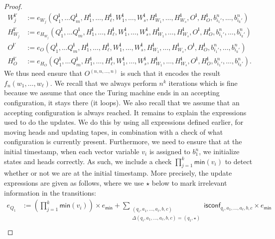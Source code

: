 \begin{proof}
\begin{align*}
		W_j^{\mathbf{i}'}&:=e_{W_j}(Q_1^{\mathbf{i}},\ldots Q_m^{\mathbf{i}},H_1^{\mathbf{i}},\ldots,H_\ell^{\mathbf{i}},W_1^{\mathbf{i}},\ldots,W_s^{\mathbf{i}},H_{W_1}^{\mathbf{i}},\ldots,H_{W_s}^{\mathbf{i}},O^{\mathbf{i}},H_O^{\mathbf{i}},b_{i_1'}^n,\ldots,b_{i_k'}^n)\\
				H_{W_j}^{\mathbf{i}'}&:=e_{H_{W_j}}(Q_1^{\mathbf{i}},\ldots Q_m^{\mathbf{i}},H_1^{\mathbf{i}},\ldots,H_\ell^{\mathbf{i}},W_1^{\mathbf{i}},\ldots,W_s^{\mathbf{i}},H_{W_1}^{\mathbf{i}},\ldots,H_{W_s}^{\mathbf{i}},O^{\mathbf{i}},H_O^{\mathbf{i}},b_{i_1'}^n,\ldots,b_{i_k'}^n)\\
O^{\mathbf{i}'}&:=e_{O}(Q_1^{\mathbf{i}},\ldots Q_m^{\mathbf{i}},H_1^{\mathbf{i}},\ldots,H_\ell^{\mathbf{i}},W_1^{\mathbf{i}},\ldots,W_s^{\mathbf{i}},H_{W_1}^{\mathbf{i}},\ldots,H_{W_s}^{\mathbf{i}},O^{\mathbf{i}},H_O^{\mathbf{i}},b_{i_1'}^n,\ldots,b_{i_k'}^n)\\
H_{O}^{\mathbf{i}'}&:=e_{H_O}(Q_1^{\mathbf{i}},\ldots Q_m^{\mathbf{i}},H_1^{\mathbf{i}},\ldots,H_\ell^{\mathbf{i}},W_1^{\mathbf{i}},\ldots,W_s^{\mathbf{i}},H_{W_1}^{\mathbf{i}},\ldots,H_{W_s}^{\mathbf{i}},O^{\mathbf{i}},H_O^{\mathbf{i}},b_{i_1'}^n,\ldots,b_{i_k'}^n).
	\end{align*}
We thus need ensure that  $O^{(n,n,\ldots,n)}$ is such that it encodes the result $f_n(w_1,\ldots,w_\ell)$. We recall that we
always perform $n^k$ iterations which is fine because we assume that once the Turing machine ends in an accepting configuration,
it stays there (it loops). We also recall that we assume that an accepting configuration is always reached. It remains to
explain the expressions used to do the updates. We do this by using all expressions defined earlier, for moving heads and updating
tapes, in combination with a check of what configuration is currently present. Furthermore, we need to ensure that at the initial timestamp,
when each vector variable $v_i$ is assigned to $b_1^n$, we initialize states and heads correctly. As such, we include a check
$\prod_{j=1}^{k} \textsf{min}(v_i)$ to detect whether or not we are at the initial timestamp. More precisely, the update expressions
are given as follows, where we use $\star$ below to mark irrelevant information in the transitions: 
    \begin{align*}   
        e_{Q_1}&:=\left(\prod_{j=1}^{k} \textsf{min}(v_i)\right)\times e_{\mathsf{min}}
        + \sum_{\substack{(q_i,a_1,\ldots,a_\ell,b,c)\\
        \Delta(q_i,a_1,\ldots,a_\ell,b,c)=(q_1,\star)}} \!\!\!\!\!\!\!\!\! \mathsf{isconf}_{q_i,a_1,\ldots,a_\ell,b,c}\times e_{\mathsf{min}} \\

\end{align*}
\end{proof}
